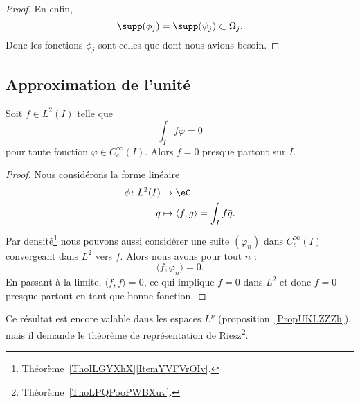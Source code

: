 \begin{proof}
	En enfin,
	\begin{equation}
		\supp(\phi_j)=\supp(\psi_j)\subset\Omega_j.
	\end{equation}
	Donc les fonctions \( \phi_j\) sont celles que dont nous avions besoin.
\end{proof}


\subsection{Approximation de l'unité}


\begin{lemma}       \label{LemDQEKNNf}
	Soit \( f\in L^2(I)\) telle que
	\begin{equation}
		\int_If\varphi=0
	\end{equation}
	pour toute fonction \( \varphi\in C^{\infty}_c(I)\). Alors \( f=0\) presque partout sur \( I\).
\end{lemma}

\begin{proof}
	Nous considérons la forme linéaire
	\begin{equation}
		\begin{aligned}
			\phi\colon L^2(I) & \to \eC                                     \\
			g                 & \mapsto \langle f, g\rangle=\int_If\bar g .
		\end{aligned}
	\end{equation}
	Par densité\footnote{Théorème~\ref{ThoILGYXhX}\ref{ItemYVFVrOIv}.} nous pouvons aussi considérer une suite \( (\varphi_n)\) dans \(  C^{\infty}_c(I)\) convergeant dans \( L^2\) vers \( f\). Alors nous avons pour tout \( n\) :
	\begin{equation}
		\langle f, \varphi_n\rangle =0.
	\end{equation}
	En passant à la limite, \( \langle f, f\rangle =0\), ce qui implique \( f=0\) dans \( L^2\) et donc \( f=0\) presque partout en tant que bonne fonction.
\end{proof}
Ce résultat est encore valable dans les espaces \( L^p\) (proposition~\ref{PropUKLZZZh}), mais il demande le théorème de représentation de Riesz\footnote{Théorème~\ref{ThoLPQPooPWBXuv}.}.

